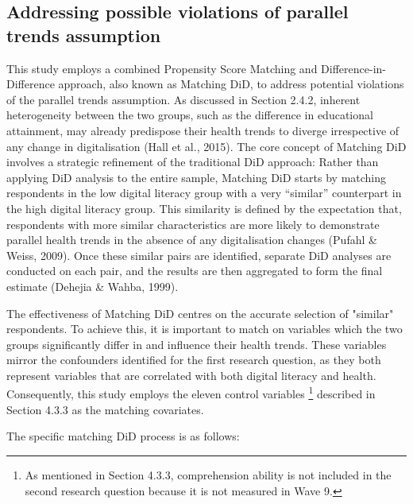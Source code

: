 \subsection{Addressing possible violations of parallel trends assumption}
This study employs a combined Propensity Score Matching and Difference-in-Difference approach, also known as Matching DiD, to address potential violations of the parallel trends assumption. As discussed in Section 2.4.2, inherent heterogeneity between the two groups, such as the difference in educational attainment, may already predispose their health trends to diverge irrespective of any change in digitalisation (Hall et al., 2015). The core concept of Matching DiD involves a strategic refinement of the traditional DiD approach: Rather than applying DiD analysis to the entire sample, Matching DiD starts by matching respondents in the low digital literacy group with a very ``similar” counterpart in the high digital literacy group. This similarity is defined by the expectation that, respondents with more similar characteristics are more likely to demonstrate parallel health trends in the absence of any digitalisation changes (Pufahl \& Weiss, 2009). Once these similar pairs are identified, separate DiD analyses are conducted on each pair, and the results are then aggregated to form the final estimate (Dehejia \& Wahba, 1999).

The effectiveness of Matching DiD centres on the accurate selection of "similar" respondents. To achieve this, it is important to match on variables which the two groups significantly differ in and influence their health trends. These variables mirror the confounders identified for the first research question, as they both represent variables that are correlated with both digital literacy and health. Consequently, this study employs the eleven control variables \footnote{As mentioned in Section 4.3.3, comprehension ability is not included in the second research question because it is not measured in Wave 9.} described in Section 4.3.3 as the matching covariates.

The specific matching DiD process is as follows:

